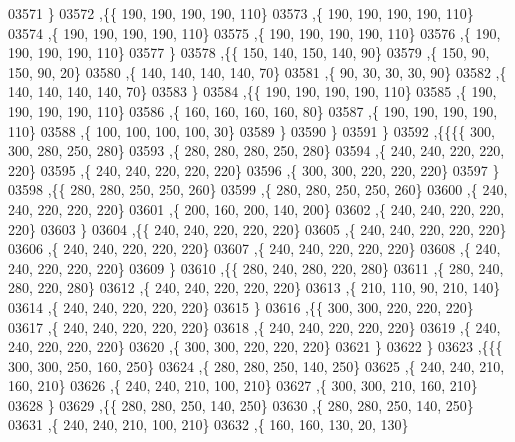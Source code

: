 \begin{DoxyCode}
03571     \}
03572    ,\{\{   190,   190,   190,   190,   110\}
03573     ,\{   190,   190,   190,   190,   110\}
03574     ,\{   190,   190,   190,   190,   110\}
03575     ,\{   190,   190,   190,   190,   110\}
03576     ,\{   190,   190,   190,   190,   110\}
03577     \}
03578    ,\{\{   150,   140,   150,   140,    90\}
03579     ,\{   150,    90,   150,    90,    20\}
03580     ,\{   140,   140,   140,   140,    70\}
03581     ,\{    90,    30,    30,    30,    90\}
03582     ,\{   140,   140,   140,   140,    70\}
03583     \}
03584    ,\{\{   190,   190,   190,   190,   110\}
03585     ,\{   190,   190,   190,   190,   110\}
03586     ,\{   160,   160,   160,   160,    80\}
03587     ,\{   190,   190,   190,   190,   110\}
03588     ,\{   100,   100,   100,   100,    30\}
03589     \}
03590    \}
03591   \}
03592  ,\{\{\{\{   300,   300,   280,   250,   280\}
03593     ,\{   280,   280,   280,   250,   280\}
03594     ,\{   240,   240,   220,   220,   220\}
03595     ,\{   240,   240,   220,   220,   220\}
03596     ,\{   300,   300,   220,   220,   220\}
03597     \}
03598    ,\{\{   280,   280,   250,   250,   260\}
03599     ,\{   280,   280,   250,   250,   260\}
03600     ,\{   240,   240,   220,   220,   220\}
03601     ,\{   200,   160,   200,   140,   200\}
03602     ,\{   240,   240,   220,   220,   220\}
03603     \}
03604    ,\{\{   240,   240,   220,   220,   220\}
03605     ,\{   240,   240,   220,   220,   220\}
03606     ,\{   240,   240,   220,   220,   220\}
03607     ,\{   240,   240,   220,   220,   220\}
03608     ,\{   240,   240,   220,   220,   220\}
03609     \}
03610    ,\{\{   280,   240,   280,   220,   280\}
03611     ,\{   280,   240,   280,   220,   280\}
03612     ,\{   240,   240,   220,   220,   220\}
03613     ,\{   210,   110,    90,   210,   140\}
03614     ,\{   240,   240,   220,   220,   220\}
03615     \}
03616    ,\{\{   300,   300,   220,   220,   220\}
03617     ,\{   240,   240,   220,   220,   220\}
03618     ,\{   240,   240,   220,   220,   220\}
03619     ,\{   240,   240,   220,   220,   220\}
03620     ,\{   300,   300,   220,   220,   220\}
03621     \}
03622    \}
03623   ,\{\{\{   300,   300,   250,   160,   250\}
03624     ,\{   280,   280,   250,   140,   250\}
03625     ,\{   240,   240,   210,   160,   210\}
03626     ,\{   240,   240,   210,   100,   210\}
03627     ,\{   300,   300,   210,   160,   210\}
03628     \}
03629    ,\{\{   280,   280,   250,   140,   250\}
03630     ,\{   280,   280,   250,   140,   250\}
03631     ,\{   240,   240,   210,   100,   210\}
03632     ,\{   160,   160,   130,    20,   130\}

\end{DoxyCode}
